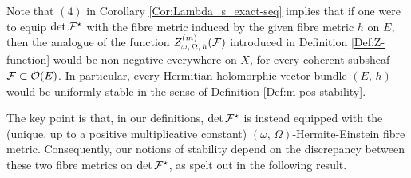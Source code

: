 \documentclass[12pt]{article}
\begin{document}
\vspace{2ex}

Note that $(4)$ in Corollary \ref{Cor:Lambda_s_exact-seq} implies that if one were to equip $\det{\cal F}^\star$ with the fibre metric induced by the given fibre metric $h$ on $E$, then the analogue of the function $Z_{\omega,\,\Omega,\,h}^{(m)}({\cal F})$ introduced in Definition \ref{Def:Z-function} would be non-negative everywhere on $X$, for every coherent subsheaf ${\cal F}\subset{\cal O}(E)$. In particular, every Hermitian holomorphic vector bundle $(E,\,h)$ would be uniformly stable in the sense of Definition \ref{Def:m-pos-stability}.

The key point is that, in our definitions, $\det{\cal F}^\star$ is instead equipped with the (unique, up to a positive multiplicative constant) $(\omega,\,\Omega)$-Hermite-Einstein fibre metric. Consequently, our notions of stability depend on the discrepancy between these two fibre metrics on $\det{\cal F}^\star$, as spelt out in the following result.
\end{document}
